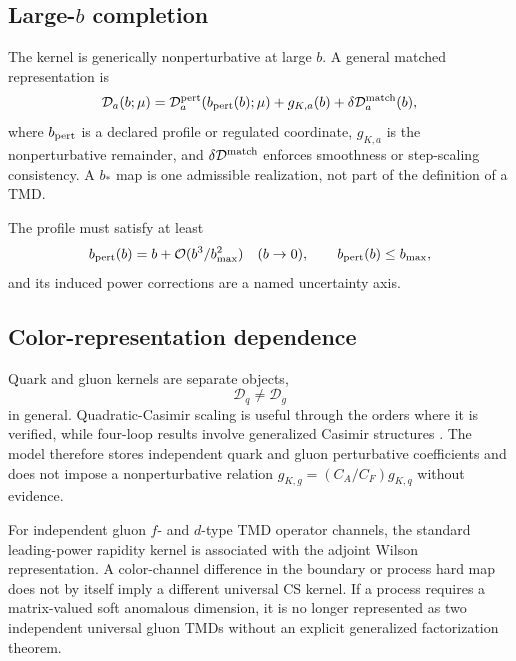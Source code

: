 \documentclass[11pt]{article}
\newcommand{\cO}{\mathcal O}
\newcommand{\cD}{\mathcal D}
\newcommand{\pert}{\mathrm{pert}}
\begin{document}
\subsection{Large-\texorpdfstring{\(b\)}{b} completion}

The kernel is generically nonperturbative at large \(b\).  A general matched
representation is
\begin{equation}
 \cD_a(b;\mu)
 =
 \cD_a^{\pert}(b_{\rm pert}(b);\mu)
 +g_{K,a}(b)
 +\delta\cD_{a}^{\rm match}(b),
 \label{eq:large-b-kernel-decomposition}
\end{equation}
where \(b_{\rm pert}\) is a declared profile or regulated coordinate,
\(g_{K,a}\) is the nonperturbative remainder, and
\(\delta\cD^{\rm match}\) enforces smoothness or step-scaling consistency.
A \(b_*\) map is one admissible realization, not part of the definition of a
TMD.

The profile must satisfy at least
\begin{equation}
 b_{\rm pert}(b)=b+\cO(b^3/b_{\max}^2)
 \quad(b\to0),
 \qquad
 b_{\rm pert}(b)\le b_{\max},
 \label{eq:b-profile-limits}
\end{equation}
and its induced power corrections are a named uncertainty axis.

\subsection{Color-representation dependence}

Quark and gluon kernels are separate objects,
\begin{equation}
 \cD_q\ne\cD_g
 \label{eq:quark-gluon-d-separation}
\end{equation}
in general.  Quadratic-Casimir scaling is useful through the orders where it
is verified, while four-loop results involve generalized Casimir structures
\cite{MoultZhuZhu2022,DuhrMistlbergerVita2022}.  The model therefore stores
independent quark and gluon perturbative coefficients and does not impose a
nonperturbative relation
\(g_{K,g}=(C_A/C_F)g_{K,q}\) without evidence.

For independent gluon \(f\)- and \(d\)-type TMD operator channels, the
standard leading-power rapidity kernel is associated with the adjoint Wilson
representation.  A color-channel difference in the boundary or process hard
map does not by itself imply a different universal CS kernel.  If a process
requires a matrix-valued soft anomalous dimension, it is no longer represented
as two independent universal gluon TMDs without an explicit generalized
factorization theorem.
\end{document}
